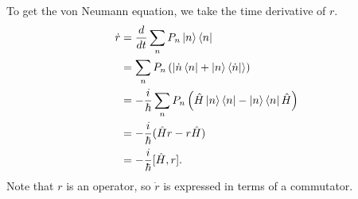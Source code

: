 \documentclass{article}
\theoremstyle{definition}
\begin{document}
To get the von Neumann equation, we take the time derivative of $r$.
\begin{align}
\dot{r} &= \frac{d}{dt}\sum_{n}P_n\ket{n}\bra{n}\nonumber\\
&= \sum_{n}P_n\left(\ket{\dot{n}\bra{n} + \ket{n}\bra{\dot{n}}} \right) \nonumber\\
&= -\frac{i}{\hbar}\sum_{n}P_n\left( \hat{H}\ket{n}\bra{n} - \ket{n}\bra{n}\hat{H}\right) \nonumber\\
&= -\frac{i}{\hbar}(\hat{H}r - r\hat{H})\nonumber\\
&= -\frac{i}{\hbar}[\hat{H},r].
\end{align}
Note that $r$ is an operator, so $\dot{r}$ is expressed in terms of a commutator. 




	
\end{document}
